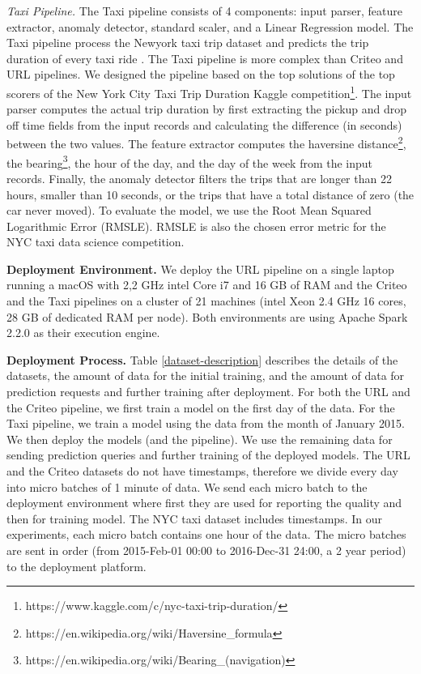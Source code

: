 \textit{Taxi Pipeline.}
The Taxi pipeline consists of 4 components: input parser, feature extractor, anomaly detector, standard scaler, and a Linear Regression model.
The Taxi pipeline process the Newyork taxi trip dataset and predicts the trip duration of every taxi ride \cite{newyork-taxi}. The Taxi pipeline is more complex than Criteo and URL pipelines. We designed the pipeline based on the top solutions of the top scorers of the New York City Taxi Trip Duration Kaggle competition\footnote{https://www.kaggle.com/c/nyc-taxi-trip-duration/}. The input parser computes the actual trip duration by first extracting the pickup and drop off time fields from the input records and calculating the difference (in seconds) between the two values.
The feature extractor computes the haversine distance\footnote{https://en.wikipedia.org/wiki/Haversine\_formula}, the bearing\footnote{https://en.wikipedia.org/wiki/Bearing\_(navigation)}, the hour of the day, and the day of the week from the input records. Finally, the anomaly detector filters the trips that are longer than 22 hours, smaller than 10 seconds, or the trips that have a total distance of zero (the car never moved). 
To evaluate the model, we use the Root Mean Squared Logarithmic Error (RMSLE).
RMSLE is also the chosen error metric for the NYC taxi data science competition.

\textbf{Deployment Environment. }
We deploy the URL pipeline on a single laptop running a macOS with 2,2 GHz intel Core i7 and 16 GB of RAM and the Criteo and the Taxi pipelines on a cluster of 21 machines (intel Xeon 2.4 GHz 16 cores, 28 GB of dedicated RAM per node).
Both environments are using Apache Spark 2.2.0 as their execution engine.

\textbf{Deployment Process. }
Table \ref{dataset-description} describes the details of the datasets, the amount of data for the initial training, and the amount of data for prediction requests and further training after deployment. 
For both the URL and the Criteo pipeline, we first train a model on the first day of the data.
For the Taxi pipeline, we train a model using the data from the month of January 2015.
We then deploy the models (and the pipeline).
We use the remaining data for sending prediction queries and further training of the deployed models.
The URL and the Criteo datasets do not have timestamps, therefore we divide every day into micro batches of 1 minute of data. 
We send each micro batch to the deployment environment where first they are used for reporting the quality and then for training model.
The NYC taxi dataset includes timestamps. 
In our experiments, each micro batch contains one hour of the data. 
The micro batches are sent in order (from 2015-Feb-01  00:00 to 2016-Dec-31 24:00, a 2 year period) to the deployment platform.

